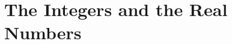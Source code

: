 \documentclass[../main.tex]{subfiles}
\begin{document}
\section{The Integers and the Real Numbers}
%
\todo{}
\end{document}
